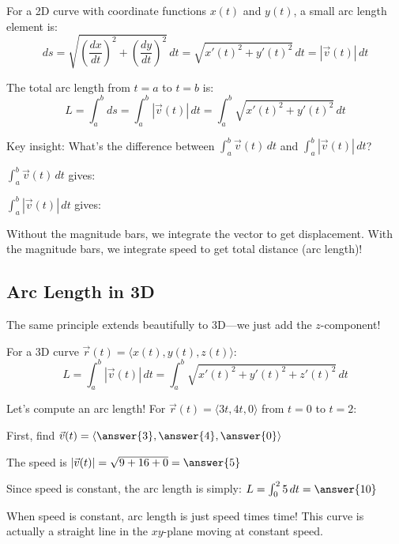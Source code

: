 \documentclass{ximera}
\begin{document}
\begin{definition}
For a 2D curve with coordinate functions $x(t)$ and $y(t)$, a small arc length element is:
$$ds=\sqrt{\left(\frac{dx}{dt}\right)^2+\left(\frac{dy}{dt}\right)^2} \, dt=\sqrt{x'(t)^2+y'(t)^2} \, dt = |\vec{v}(t)| \, dt$$

The total arc length from $t=a$ to $t=b$ is:
$$L = \int_a^b ds = \int_a^b |\vec{v}(t)| \, dt = \int_a^b \sqrt{x'(t)^2+y'(t)^2} \, dt$$
\end{definition}

\begin{problem}
Key insight: What's the difference between $\int_a^b \vec{v}(t) \, dt$ and $\int_a^b |\vec{v}(t)| \, dt$?

$\int_a^b \vec{v}(t) \, dt$ gives:
\begin{multipleChoice}
\end{multipleChoice}

$\int_a^b |\vec{v}(t)| \, dt$ gives:
\begin{multipleChoice}
\end{multipleChoice}

\begin{feedback}
Without the magnitude bars, we integrate the vector to get displacement. With the magnitude bars, we integrate speed to get total distance (arc length)!
\end{feedback}
\end{problem}

\subsection*{Arc Length in 3D}

The same principle extends beautifully to 3D—we just add the $z$-component!

\begin{definition}
For a 3D curve $\vec{r}(t) = \langle x(t), y(t), z(t) \rangle$:
$$L = \int_a^b |\vec{v}(t)| \, dt = \int_a^b \sqrt{x'(t)^2+y'(t)^2+z'(t)^2} \, dt$$
\end{definition}

\begin{problem}
Let's compute an arc length! For $\vec{r}(t) = \langle 3t, 4t, 0 \rangle$ from $t=0$ to $t=2$:

First, find $\vec{v}(t) = \langle \answer{3}, \answer{4}, \answer{0} \rangle$

The speed is $|\vec{v}(t)| = \sqrt{9 + 16 + 0} = \answer{5}$

Since speed is constant, the arc length is simply:
$L = \int_0^2 5 \, dt = \answer{10}$

\begin{feedback}
When speed is constant, arc length is just speed times time! This curve is actually a straight line in the $xy$-plane moving at constant speed.
\end{feedback}
\end{problem}
\end{document}
